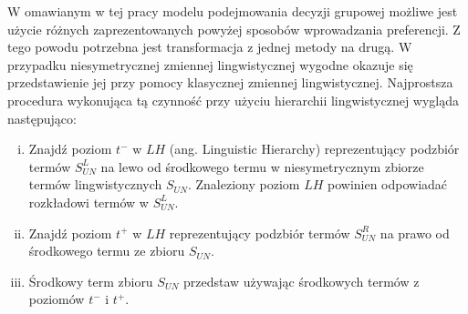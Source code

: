 W omawianym w tej pracy modelu podejmowania decyzji grupowej możliwe jest użycie
różnych zaprezentowanych powyżej sposobów wprowadzania preferencji. Z tego
powodu potrzebna jest transformacja z jednej metody na drugą. W przypadku
niesymetrycznej zmiennej lingwistycznej wygodne okazuje się przedstawienie jej
przy pomocy klasycznej zmiennej lingwistycznej. Najprostsza procedura wykonująca
tą czynność przy użyciu hierarchii lingwistycznej wygląda następująco:
\begin{enumerate}[i.]
  \item Znajdź poziom $t^-$ w $LH$ (ang. Linguistic Hierarchy) reprezentujący
  podzbiór termów $S^L_{UN}$ na lewo od środkowego termu w niesymetrycznym
  zbiorze termów lingwistycznych $S_{UN}$. Znaleziony poziom $LH$ powinien
  odpowiadać rozkładowi termów w $S^L_{UN}.$
  \item Znajdź poziom $t^+$ w $LH$ reprezentujący podzbiór termów $S^R_{UN}$ na
  prawo od środkowego termu ze zbioru $S_{UN}.$
  \item Środkowy term zbioru $S_{UN}$ przedstaw używając środkowych
  termów z poziomów $t^-$ i $t^+.$
\end{enumerate}

